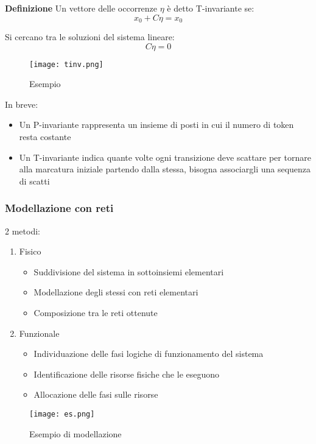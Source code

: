 \documentclass{article}
\begin{document}
\newpage

\noindent\textbf{Definizione} Un vettore delle occorrenze $\eta$ è detto T-invariante se:
$$x_0+C\eta=x_0$$

\noindent Si cercano tra le soluzioni del sistema lineare:
$$C\eta=0$$

\begin{figure}[ht]
    \centering
    \texttt{[image: tinv.png]}
    \caption{Esempio}
\end{figure}

\noindent In breve:
\begin{itemize}
    \item Un P-invariante rappresenta un insieme di posti in cui il numero di token resta costante
    \item Un T-invariante indica quante volte ogni transizione deve scattare per tornare alla marcatura iniziale partendo dalla stessa, bisogna associargli una sequenza di scatti
\end{itemize}

\subsubsection{Modellazione con reti}

2 metodi:
\begin{enumerate}
    \item Fisico
        \begin{itemize}
            \item Suddivisione del sistema in sottoinsiemi elementari
            \item Modellazione degli stessi con reti elementari
            \item Composizione tra le reti ottenute
        \end{itemize}
    \item Funzionale
        \begin{itemize}
            \item Individuazione delle fasi logiche di funzionamento del sistema
            \item Identificazione delle risorse fisiche che le eseguono
            \item Allocazione delle fasi sulle risorse\newline
        \end{itemize}
\end{enumerate}

\begin{figure}[ht]
    \centering
    \texttt{[image: es.png]}
    \caption{Esempio di modellazione}
\end{figure}
\end{document}
